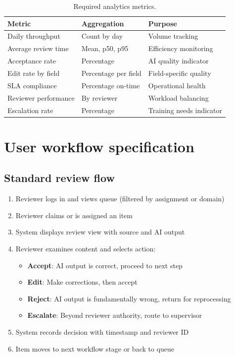 \documentclass[11pt,a4paper,twoside]{report}
\begin{document}
\begin{table}[htbp]
\centering
\caption{Required analytics metrics.}
\label{tab:analytics-metrics}
\footnotesize
\begin{tabularx}{\linewidth}{@{}l l X@{}}
\toprule
\textbf{Metric} & \textbf{Aggregation} & \textbf{Purpose} \\ \midrule
Daily throughput & Count by day & Volume tracking \\
Average review time & Mean, p50, p95 & Efficiency monitoring \\
Acceptance rate & Percentage & AI quality indicator \\
Edit rate by field & Percentage per field & Field-specific quality \\
SLA compliance & Percentage on-time & Operational health \\
Reviewer performance & By reviewer & Workload balancing \\
Escalation rate & Percentage & Training needs indicator \\
\bottomrule
\end{tabularx}
\end{table}

\section{User workflow specification}

\subsection{Standard review flow}

\begin{enumerate}
\item Reviewer logs in and views queue (filtered by assignment or domain)
\item Reviewer claims or is assigned an item
\item System displays review view with source and AI output
\item Reviewer examines content and selects action:
\begin{itemize}
\item \textbf{Accept}: AI output is correct, proceed to next step
\item \textbf{Edit}: Make corrections, then accept
\item \textbf{Reject}: AI output is fundamentally wrong, return for reprocessing
\item \textbf{Escalate}: Beyond reviewer authority, route to supervisor
\end{itemize}
\item System records decision with timestamp and reviewer ID
\item Item moves to next workflow stage or back to queue
\end{enumerate}
\end{document}
